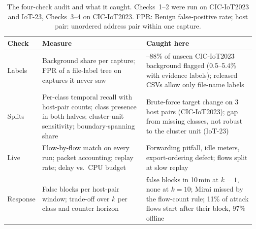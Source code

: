 \begin{table}[t]
\centering
\caption{The four-check audit and what it caught. Checks~1--2 were run on CIC-IoT2023 and IoT-23, Checks~3--4 on CIC-IoT2023. FPR: Benign false-positive rate; host pair: unordered address pair within one capture.}
\label{tab:checklist}
\footnotesize
\setlength{\tabcolsep}{3pt}
\begin{tabular}{>{\raggedright\arraybackslash}p{1.55cm}>{\raggedright\arraybackslash}p{3.2cm}>{\raggedright\arraybackslash}p{3.25cm}}
\toprule
Check & Measure & Caught here \\
\midrule
1 Labels & Background share per capture; FPR of a file-label tree on captures it never saw & 71--88\% of unseen CIC-IoT2023 background flagged (0.5--5.4\% with evidence labels); released CSVs allow only file-name labels \\
\addlinespace[2pt]
2 Splits & Per-class temporal recall with host-pair counts; class presence in both halves; cluster-unit sensitivity; boundary-spanning share & Brute-force target change on 3 host pairs (CIC-IoT2023); gap from missing classes, not robust to the cluster unit (IoT-23) \\
\addlinespace[2pt]
3 Live & Flow-by-flow match on every run; packet accounting; replay rate; delay vs.\ CPU budget & Forwarding pitfall, idle meters, export-ordering defect; flows split at slow replay \\
\addlinespace[2pt]
4 Response & False blocks per host-pair window; trade-off over $k$ per class and counter horizon & 60 false blocks in 10\,min at $k=1$, none at $k=10$; Mirai missed by the flow-count rule; 11\% of attack flows start after their block, 97\% offline \\
\bottomrule
\end{tabular}
\end{table}

